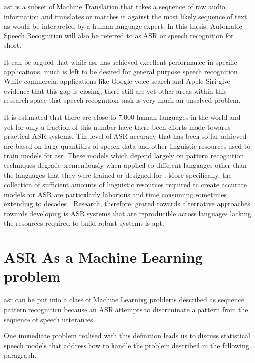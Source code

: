 \acrfull{asr} is a subset of Machine Translation that takes a sequence of raw audio information and translates or matches it against the most likely sequence of text as would be interpreted by a human language expert.  In this thesis, Automatic Speech Recognition will also be referred to as 
ASR or speech recognition for short.

It can be argued that while \acrshort{asr} has achieved excellent performance in specific applications, much is left to be desired for general purpose speech recognition \citep{yu2016automatic}. While commercial applications like Google voice search and Apple Siri give evidence that this gap is closing, there still are yet other areas within this research space that speech recognition task is very much an unsolved problem.

It is estimated that there are close to 7,000 human languages in the world \citep{besacier2014automatic} and yet for only a fraction of this number have there been efforts made towards practical ASR systems.  The level of ASR accuracy that has been so far achieved are based on large quantities of speech data and other linguistic resources used to train models for \acrshort{asr}. These models which depend largely on pattern recognition techniques degrade tremendously  when applied to different languages other than the languages that they were trained or designed for  \citep{Rosenberg2017end,besacier2014introduction}. More specifically, the collection of sufficient amounts of linguistic resources required to create accurate models for ASR are particularly laborious and time consuming sometimes extending to decades \citep{goldman2011easyalign,stan2016alisa}.  Research, therefore, geared towards alternative approaches towards developing is ASR systems that are reproducible across languages lacking the resources required to build robust systems is apt.

\section{ASR As a Machine Learning  problem}\label{ASRMLP}
\pagestyle{plain}
\acrlong{asr} can be put into a class of Machine Learning problems described as sequence pattern recognition because an ASR attempts to discriminate a pattern from the sequence of speech utterances. 

One immediate problem realised with this definition leads us to discuss statistical speech models that address how to handle the problem described in the following paragraph.

